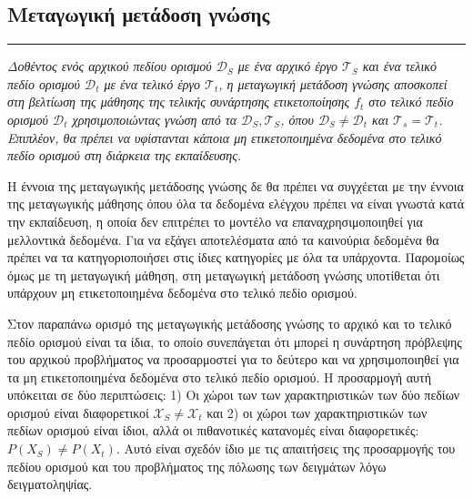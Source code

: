 \subsection{Μεταγωγική μετάδοση γνώσης}
{ \rule{1ex}{1ex} }%
\textit{Δοθέντος ενός αρχικού πεδίου ορισμού $\mathcal{D}_S$ με ένα αρχικό έργο $\mathcal{T}_S$ και ένα τελικό πεδίο ορισμού $\mathcal{D}_t$ με ένα τελικό έργο $\mathcal{T}_t$, η μεταγωγική μετάδοση γνώσης αποσκοπεί στη βελτίωση της μάθησης της τελικής συνάρτησης ετικετοποίησης $f_t$ στο τελικό πεδίο ορισμού $\mathcal{D}_t$ χρησιμοποιώντας γνώση από τα $\mathcal{D}_S, \mathcal{T}_S$, όπου $\mathcal{D}_S \neq \mathcal{D}_t$ και $ \mathcal{T}_s = \mathcal{T}_t $. Επιπλέον, θα πρέπει να υφίστανται κάποια μη ετικετοποιημένα δεδομένα στο τελικό πεδίο ορισμού στη διάρκεια της εκπαίδευσης.}

Η έννοια της μεταγωγικής μετάδοσης γνώσης δε θα πρέπει να συγχέεται με την έννοια της μεταγωγικής μάθησης όπου όλα τα δεδομένα ελέγχου πρέπει να είναι γνωστά κατά την εκπαίδευση, η οποία δεν επιτρέπει το μοντέλο να επαναχρησιμοποιηθεί για μελλοντικά δεδομένα. Για να εξάγει αποτελέσματα από τα καινούρια δεδομένα θα πρέπει να τα κατηγοριοποιήσει στις ίδιες κατηγορίες με όλα τα υπάρχοντα. Παρομοίως όμως με τη μεταγωγική μάθηση, στη μεταγωγική μετάδοση γνώσης υποτίθεται ότι υπάρχουν μη ετικετοποιημένα δεδομένα στο τελικό πεδίο ορισμού. 

Στον παραπάνω ορισμό της μεταγωγικής μετάδοσης γνώσης το αρχικό και το τελικό πεδίο ορισμού είναι τα ίδια, το οποίο συνεπάγεται ότι μπορεί η συνάρτηση πρόβλεψης του αρχικού προβλήματος να προσαρμοστεί για το δεύτερο και να χρησιμοποιηθεί για τα μη ετικετοποιημένα δεδομένα στο τελικό πεδίο ορισμού. Η προσαρμογή αυτή υπόκειται σε δύο περιπτώσεις: 1) Οι χώροι των των χαρακτηριστικών των δύο πεδίων ορισμού είναι διαφορετικοί $ \mathcal{X}_S \neq \mathcal{X}_t $ και 2) οι χώροι των χαρακτηριστικών των πεδίων ορισμού είναι ίδιοι, αλλά οι πιθανοτικές κατανομές είναι διαφορετικές: $ P\left(X_S\right) \neq P\left( X_t\right)$.  Αυτό είναι σχεδόν ίδιο με τις απαιτήσεις της προσαρμογής του πεδίου ορισμού και του προβλήματος της πόλωσης των δειγμάτων λόγω δειγματοληψίας.

